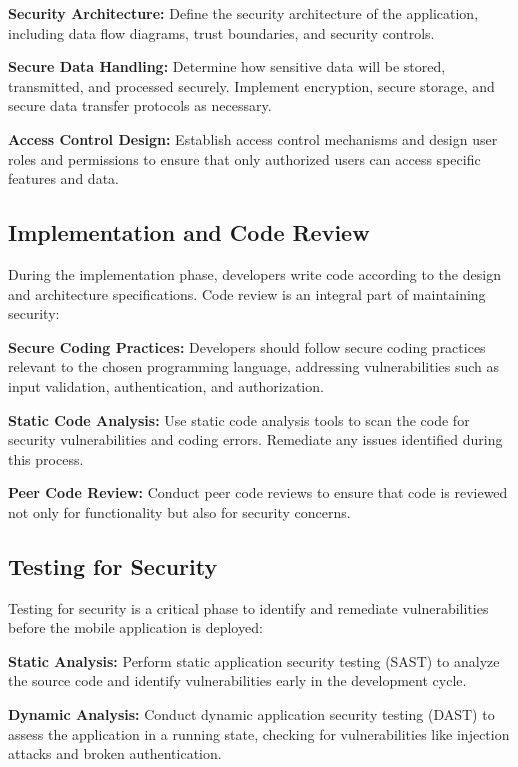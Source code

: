 \documentclass[conference]{IEEEtran}
\begin{document}
\textbf{Security Architecture:} Define the security architecture of the application, including data flow diagrams, trust boundaries, and security controls.

\textbf{Secure Data Handling:} Determine how sensitive data will be stored, transmitted, and processed securely. Implement encryption, secure storage, and secure data transfer protocols as necessary.

\textbf{Access Control Design:} Establish access control mechanisms and design user roles and permissions to ensure that only authorized users can access specific features and data.

\subsection{Implementation and Code Review}

During the implementation phase, developers write code according to the design and architecture specifications. Code review is an integral part of maintaining security:

\textbf{Secure Coding Practices:} Developers should follow secure coding practices relevant to the chosen programming language, addressing vulnerabilities such as input validation, authentication, and authorization.

\textbf{Static Code Analysis:} Use static code analysis tools to scan the code for security vulnerabilities and coding errors. Remediate any issues identified during this process.

\textbf{Peer Code Review:} Conduct peer code reviews to ensure that code is reviewed not only for functionality but also for security concerns.

\subsection{Testing for Security}

Testing for security is a critical phase to identify and remediate vulnerabilities before the mobile application is deployed:

\textbf{Static Analysis:} Perform static application security testing (SAST) to analyze the source code and identify vulnerabilities early in the development cycle.

\textbf{Dynamic Analysis:} Conduct dynamic application security testing (DAST) to assess the application in a running state, checking for vulnerabilities like injection attacks and broken authentication.
\end{document}
